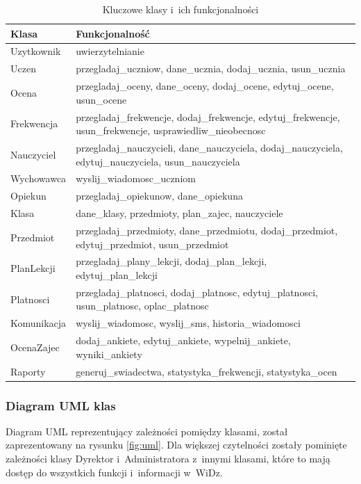 \documentclass[12pt,leqno,twoside]{mwart}
\begin{document}
\begin{table}[h]
	\centering
	\caption{Kluczowe klasy i~ich funkcjonalności}
		\begin{tabular}{|l|p{12cm}|}
		\hline
		\textbf{Klasa} & \textbf{Funkcjonalność} \\ \hline
		Uzytkownik & uwierzytelnianie \\ \hline
		Uczen & przegladaj\_uczniow, dane\_ucznia, dodaj\_ucznia, usun\_ucznia \\ \hline
		Ocena & przegladaj\_oceny, dane\_oceny, dodaj\_ocene, edytuj\_ocene, usun\_ocene \\ \hline
		Frekwencja & przegladaj\_frekwencje, dodaj\_frekwencje, edytuj\_frekwencje, usun\_frekwencje, usprawiedliw\_nieobecnosc \\ \hline
		Nauczyciel & przegladaj\_nauczycieli, dane\_nauczyciela, dodaj\_nauczyciela, edytuj\_nauczyciela, usun\_nauczyciela \\ \hline
		Wychowawca & wyslij\_wiadomosc\_uczniom \\ \hline
		Opiekun & przegladaj\_opiekunow, dane\_opiekuna \\ \hline
		Klasa & dane\_klasy, przedmioty, plan\_zajec, nauczyciele \\ \hline
		Przedmiot & przegladaj\_przedmioty, dane\_przedmiotu, dodaj\_przedmiot, edytuj\_przedmiot, usun\_przedmiot \\ \hline
		PlanLekcji & przegladaj\_plany\_lekcji, dodaj\_plan\_lekcji, edytuj\_plan\_lekcji \\ \hline
		Platnosci & przegladaj\_platnosci, dodaj\_platnosc, edytuj\_platnosci, usun\_platnosc, oplac\_platnosc \\ \hline
		Komunikacja & wyslij\_wiadomosc, wyslij\_sms, historia\_wiadomosci \\ \hline
		OcenaZajec & dodaj\_ankiete, edytuj\_ankiete, wypelnij\_ankiete, wyniki\_ankiety \\ \hline
		Raporty & generuj\_swiadectwa, statystyka\_frekwencji, statystyka\_ocen \\ \hline
		\end{tabular}
	\label{kluczowe_klasy}
\end{table}

\subsubsection{Diagram UML klas}\label{UML}
\noindent Diagram UML reprezentujący zależności pomiędzy klasami, został zaprezentowany na rysunku \ref{fig:uml}. Dla większej czytelności zostały pominięte zależności klasy Dyrektor i~Administratora z~innymi klasami, które to mają dostęp do wszystkich funkcji i~informacji w~WiDz.
\end{document}
